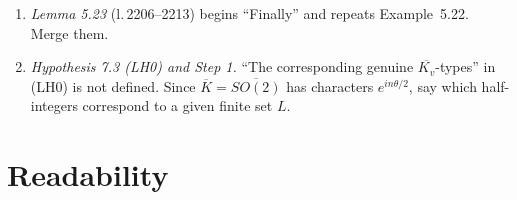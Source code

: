 \documentclass[12pt,letterpaper]{article}
\DeclareMathOperator{\sgn}{sgn}
\newcommand{\R}{\mathbb{R}}
\newcommand{\ov}[1]{\overline{#1}}
\newcommand{\lref}[1]{\textup{(l.\,#1)}}
\theoremstyle{plain}
\begin{document}
\begin{enumerate}
\begin{itemize}
\item \lref{3049--3056}: the kernel $k_\epsilon(x,y)$ is written with
$\tfrac{a+d}{c}q(x)$ and then with $\tfrac{a+d\mp2}{c}xy$. Off the
diagonal the phase is $(ax^2+dy^2\mp2xy)q/c$; the displayed formulas are
right only for $x=y$. A factor $\tfrac12$ is lost between the kernel and
the following Remark.
\item \lref{3254--3256}: $|\det(g-1)|^{1/2}=2|\sin(\theta/2)|$, so the
second line should have $2|\sin(\theta/2)|$ and $2|\cos(\theta/2)|$,
without the exponent $1/2$. (This is what agrees with the formulas quoted
from Adams.)
\item $\gamma(\tau)=\exp(\tfrac{\pi i}{4}\sgn q)$ \lref{3166} and
$\gamma(q)=\exp(-\tfrac{i\pi}{4}\sgn q)$ \lref{3265} contradict each
other.
\item \lref{3123}: the $n$-dimensional Fresnel integral is missing the
phase $e^{\pi i n\,\sgn(a)/4}$, and $F^n$ should be $\R^n$.
\item \lref{3029--3031}: the ``trick'' ignores the scalar $\omega(-1)$ by
which $(-I,1)$ acts and the cocycle $\beta(-I,g)$.
\item \lref{3007}: $L^2(G)_\epsilon$ should be $L^2(F)_\epsilon$;
\lref{3232}: stray ``$|$''.
\end{itemize}
\item \emph{Lemma 5.23} \lref{2206--2213} begins
``Finally'' and repeats Example~5.22. Merge them.
\item \emph{Hypothesis 7.3 (LH0) and Step 1.} ``The corresponding genuine
$\ov{K_v}$-types'' in (LH0) is not defined. Since $\ov K=\ov{SO(2)}$ has
characters $e^{in\theta/2}$, say which half-integers correspond to a given
finite set $L$.
\end{enumerate}

\section{Readability}\label{sec:read}
\end{document}

